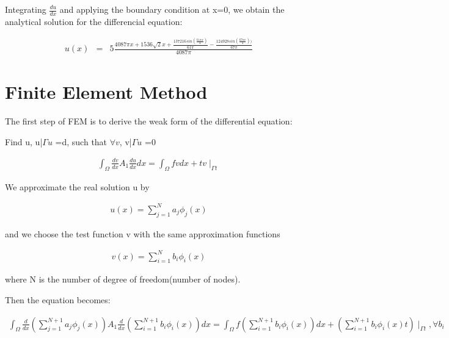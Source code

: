 \documentclass[paper=a4, fontsize=11pt]{article} %
\begin{document}
Integrating $\frac{du}{dx}$ and applying the boundary condition at x=0, we obtain the analytical solution for the differencial equation:

\begin{eqnarray}
u(x)&=& 5\frac{4087\pi x + 1536\sqrt{2}x + \frac{137216sin(\frac{61\pi x}{4})}{61\pi}- \frac{124928sin(\frac{67\pi x}{4}))}{67\pi}}{4087\pi}
\end{eqnarray}





\section{Finite Element Method}
The first step of FEM is to derive the weak form of the differential equation:

Find u, u|$\Gamma u$ =d, such that $\forall v$, v|$\Gamma u$ =0

\begin{eqnarray}
\int_{\Omega} \frac{dv}{dx} A_1 \frac{du}{dx} dx = \int_{\Omega} fv dx + tv \mid _{\Gamma t}
\end{eqnarray}


We approximate the real solution u by

\begin{eqnarray}
u(x) = \sum_{j=1}^{N} a_j \phi_j(x)
\end{eqnarray}

and we choose the test function v with the same approximation functions

\begin{eqnarray}
v(x) = \sum_{i=1}^{N} b_i \phi_i(x)
\end{eqnarray}

where N is the number of degree of freedom(number of nodes). 


Then the equation becomes:

\begin{eqnarray}
\int_{\Omega} \frac{d}{dx} (\sum_{j=1}^{N+1} a_j \phi_j(x)) A_1 \frac{d}{dx} (\sum_{i=1}^{N+1} b_i \phi_i(x))dx = \int_{\Omega} f (\sum_{i=1}^{N+1} b_i \phi_i(x)) dx + (\sum_{i=1}^{N+1} b_i \phi_i(x) t) \mid _{\Gamma t}, \forall b_i
\end{eqnarray}
\end{document}
